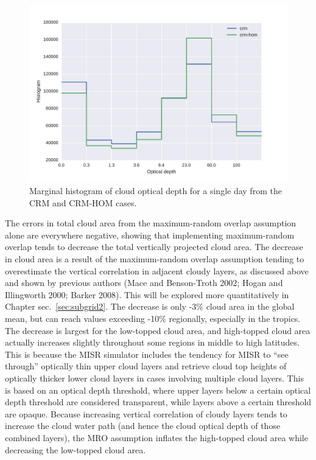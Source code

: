 \begin{figure}[htbp]
\centering
\includegraphics{graphics/taudist_hom.pdf}
\caption{\label{fig:subgrid1_cldtau_distribution}Marginal histogram of
cloud optical depth for a single day from the CRM and CRM-HOM
cases.}\label{fig:subgrid1ux5fcldtauux5fdistribution}
\end{figure}

The errors in total cloud area from the maximum-random overlap
assumption alone are everywhere negative, showing that implementing
maximum-random overlap tends to decrease the total vertically projected
cloud area. The decrease in cloud area is a result of the maximum-random
overlap assumption tending to overestimate the vertical correlation in
adjacent cloudy layers, as discussed above and shown by previous authors
(Mace and Benson-Troth 2002; Hogan and Illingworth 2000; Barker 2008).
This will be explored more quantitatively in Chapter
sec.~\ref{sec:subgrid2}. The decrease is only -3\% cloud area in the
global mean, but can reach values exceeding -10\% regionally, especially
in the tropics. The decrease is largest for the low-topped cloud area,
and high-topped cloud area actually increases slightly throughout some
regions in middle to high latitudes. This is because the MISR simulator
includes the tendency for MISR to ``see through'' optically thin upper
cloud layers and retrieve cloud top heights of optically thicker lower
cloud layers in cases involving multiple cloud layers. This is based on
an optical depth threshold, where upper layers below a certain optical
depth threshold are considered transparent, while layers above a certain
threshold are opaque. Because increasing vertical correlation of cloudy
layers tends to increase the cloud water path (and hence the cloud
optical depth of those combined layers), the MRO assumption inflates the
high-topped cloud area while decreasing the low-topped cloud area.

